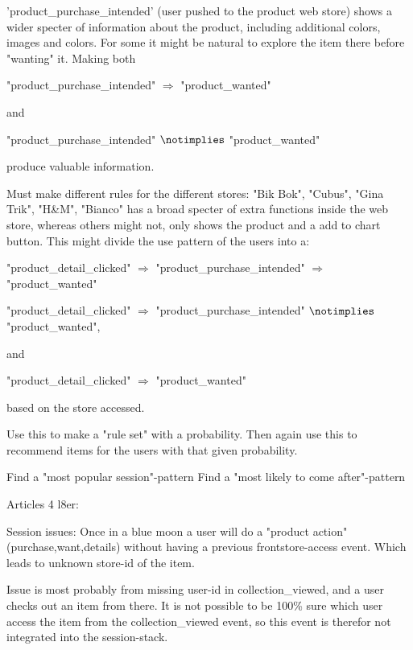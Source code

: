 'product\_purchase\_intended' (user pushed to the product web store) shows a
wider specter of information about the product, including additional colors,
images and colors.  For some it might be natural to explore the item there
before "wanting" it. Making both

"product\_purchase\_intended" $\Rightarrow$ "product\_wanted"

and

"product\_purchase\_intended" $\notimplies$ "product\_wanted"

produce valuable information.

Must make different rules for the different stores:
"Bik Bok", "Cubus", "Gina Trik", "H\&M", "Bianco" has a broad specter of extra
functions inside the web store, whereas others might not, only shows the
product and a add to chart button.  This might divide the use pattern of the
users into a:

"product\_detail\_clicked" $\Rightarrow$ "product\_purchase\_intended" $\Rightarrow$ "product\_wanted"

"product\_detail\_clicked" $\Rightarrow$ "product\_purchase\_intended" $\notimplies$ "product\_wanted",

and

"product\_detail\_clicked" $\Rightarrow$ "product\_wanted"

based on the store accessed.

Use this to make a "rule set" with a probability.
Then again use this to recommend items for the users with that given
probability.

Find a "most popular session"-pattern
Find a "most likely to come after"-pattern

Articles 4 l8er:

Session issues:
Once in a blue moon a user will do a "product action" (purchase,want,details)
without having a previous frontstore-access event. Which leads to unknown
store-id of the item.

Issue is most probably from missing user-id in collection\_viewed, and a user
checks out an item from there. It is not possible to be 100\% sure which user
access the item from the collection\_viewed event, so this event is therefor
not integrated into the session-stack.


